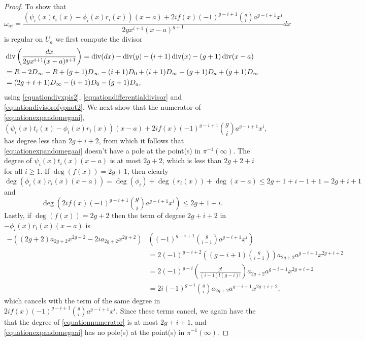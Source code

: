\begin{proof}
    To show that
        \begin{equation}\label{equationexpandomegaai}
        \omega_{a i} =  \frac{(\psi_i(x)t_i(x) - \phi_i(x)r_i(x))(x-a) + 2if(x)(-1)^{g-i+1}\binom{g}{i} a^{g-i+1}x^i}{2yx^{i+1}(x-a)^{g+1}}dx
        \end{equation}
    is regular on $U_a$ we first compute the divisor
        \begin{align*}
        & \operatorname{div}\left( \frac{dx}{2yx^{i+1}(x-a)^{g+1}}\right)  = \operatorname{div}(dx) - \operatorname{div}(y) - (i+1)\operatorname{div}(x) - (g+1)\operatorname{div}(x-a) \\
        & = R - 2D_\infty - R + (g+1)D_\infty - (i+1)D_0 + (i+1)D_\infty  - (g+1)D_a + (g+1)D_\infty \\
        & = (2g+i+1)D_\infty -(i+1)D_0 - (g+1)D_a,
        \end{align*}
    using \eqref{equationdivxpis2}, \eqref{equationdifferentialdivisor} and \eqref{equationdivisorofypnot2}.
    We next show that the numerator of \eqref{equationexpandomegaai},
        \begin{equation}\label{equationnumerator}
        {(\psi_i(x)t_i(x) - \phi_i(x)r_i(x))(x-a) + 2if(x)(-1)^{g-i+1}\binom{g}{i} a^{g-i+1}x^i},
        \end{equation}
    has degree less than $2g+i+2$, from which it follows that \eqref{equationexpandomegaai} doesn't have a pole at the point(s) in $\pi^{-1}(\infty)$.
    The degree of $\psi_i(x)t_i(x)(x-a)$ is at most $2g+2$, which is less than $2g+2+i$ for all $i \geq 1$.
    If $\deg(f(x)) = 2g+1$, then clearly
        \[
        \deg\left( \phi_i(x)r_i(x)(x-a) \right) = \deg(\phi_i) + \deg(r_i(x)) + \deg(x-a) \leq 2g+1 + i-1 +1 = 2g+i+1
        \]
    and
        \[
        \deg \left( 2if(x)(-1)^{g-i+1}\binom{g}{i} a^{g-i+1}x^i \right)  \leq  2g+1+i .
        \]
    Lastly, if $\deg(f(x)) = 2g+2$ then the term of degree $2g+i+2$ in $-\phi_i(x)r_i(x)(x-a)$ is
        \begin{align*}
        -((2g+2)a_{2g+2}x^{2g+2}-2ia_{2g+2}x^{2g+2})&\left( (-1)^{g-i+1}\binom{g}{i-1}a^{g-i+1}x^i\right) \\
        &  = 2(-1)^{g-i+2}\left( (g-i+1)\binom{g}{i-1} \right) a_{2g+2}a^{g-i+1}x^{2g+i+2} \\
        & = 2(-1)^{g-i} \left( \frac{g!}{(i-1)!(g-i)!} \right) a_{2g+2}a^{g-i+1}x^{2g+i+2} \\
        & = 2i(-1)^{g-i}\binom{g}{i}a_{2g+2}a^{g-i+1}x^{2g+i+2},
        \end{align*}
    which cancels with the term of the same degree in $2if(x)(-1)^{g-i+1}\binom{g}{i}a^{g-i+1}x^i$.
    Since these terms cancel, we again have the that the degree of \eqref{equationnumerator} is at most $2g+i+1$, and \eqref{equationexpandomegaai} has no pole(s) at the point(s) in $\pi^{-1}(\infty)$.
    

\end{proof}
